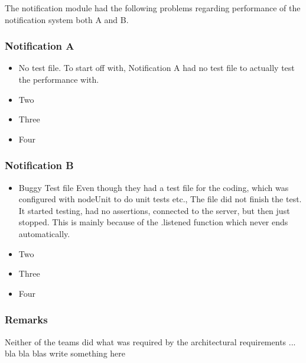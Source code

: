 The notification module had the following problems regarding performance of the notification system both A and B. 
\subsubsection*{Notification A}
\begin{itemize}
    \item No test file.
    To start off with, Notification A had no test file to actually test the performance with.
    \item Two 
    \item Three 
    \item Four 
\end{itemize}
\subsubsection*{Notification B}
\begin{itemize}
    \item Buggy Test file
    Even though they had a test file for the coding, which was configured with nodeUnit to do unit tests etc.,
    The file did not finish the test.  It started testing, had no assertions, connected to the server, but then just stopped. This is mainly because of the .listened function which never ends automatically.
    \item Two 
    \item Three 
    \item Four 
\end{itemize}
\subsubsection*{Remarks}
Neither of the teams did what was required by the architectural requirements  ... bla bla blas write something here 